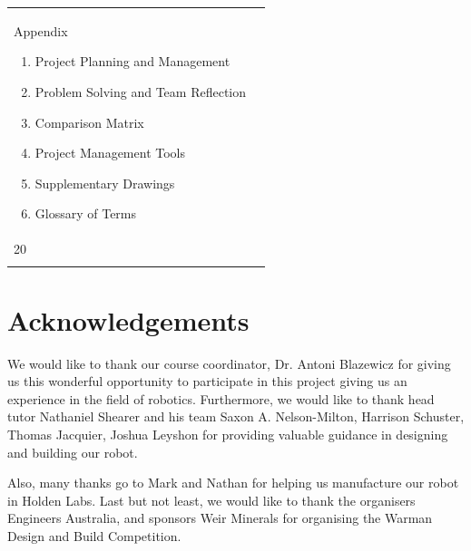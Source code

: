 \documentclass[12pt]{report}
\begin{document}
\begin{tabular}{ p{} p{} }
Appendix
\begin{enumerate}[label=\Alph*.]
\item Project Planning and Management
\item Problem Solving and Team Reflection
\item Comparison Matrix 
\item Project Management Tools 
\item Supplementary Drawings 
\item Glossary of Terms 
\end{enumerate}
&
\begin{flushright}
\vspace{-0.3cm}
\item []  19 \\[0.25\linewidth]
\item []  20 \\[0.3\linewidth]
\end{flushright}

\tabularnewline
\end{tabular}
\pagebreak

\section*{Acknowledgements}
We would like to thank our course coordinator, Dr. Antoni Blazewicz for giving us this wonderful opportunity to participate in this project giving us an experience in the field of robotics. Furthermore, we would like to thank head tutor Nathaniel Shearer and his team Saxon A. Nelson-Milton, Harrison Schuster, Thomas Jacquier, Joshua Leyshon for providing valuable guidance in designing and building our robot.

Also, many thanks go to Mark and Nathan for helping us manufacture our robot in Holden Labs. Last but not least, we would like to thank the organisers Engineers Australia, and sponsors Weir Minerals for organising the Warman Design and Build Competition.


\pagebreak

\end{document}
